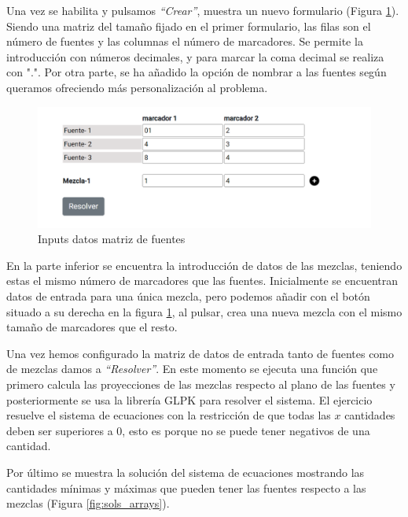 Una vez se habilita y pulsamos \textit{``Crear''}, muestra un nuevo formulario (Figura \ref{fig:data_matrix}). Siendo una matriz del tamaño fijado en el primer formulario, las filas son el número de fuentes y las columnas el número de marcadores. Se permite la introducción con números decimales, y para marcar la coma decimal se realiza con ".". Por otra parte, se ha añadido la opción de nombrar a las fuentes según queramos ofreciendo más personalización al problema.

\begin{figure}[h!] 
\centering
    \includegraphics[width=1\textwidth]{img/datos_matriz.PNG}
\caption{Inputs datos matriz de fuentes}
\label{fig:data_matrix}
\end{figure}

En la parte inferior se encuentra la introducción de datos de las mezclas, teniendo estas el mismo número de marcadores que las fuentes. Inicialmente se encuentran datos de entrada para una única mezcla, pero podemos añadir con el botón situado a su derecha en la figura \ref{fig:data_matrix}, al pulsar, crea una nueva mezcla con el mismo tamaño de marcadores que el resto. 

Una vez hemos configurado la matriz de datos de entrada tanto de fuentes como de mezclas damos a \textit{``Resolver''}. En este momento se ejecuta una función que primero calcula las proyecciones de las mezclas respecto al plano de las fuentes y posteriormente se usa la librería GLPK para resolver el sistema. El ejercicio resuelve el sistema de ecuaciones con la restricción de que todas las $x$ cantidades deben ser superiores a $0$, esto es porque no se puede tener negativos de una cantidad. 

Por último se muestra la solución del sistema de ecuaciones mostrando las cantidades mínimas y máximas que pueden tener las fuentes respecto a las mezclas (Figura \ref{fig:sols_arrays}).

